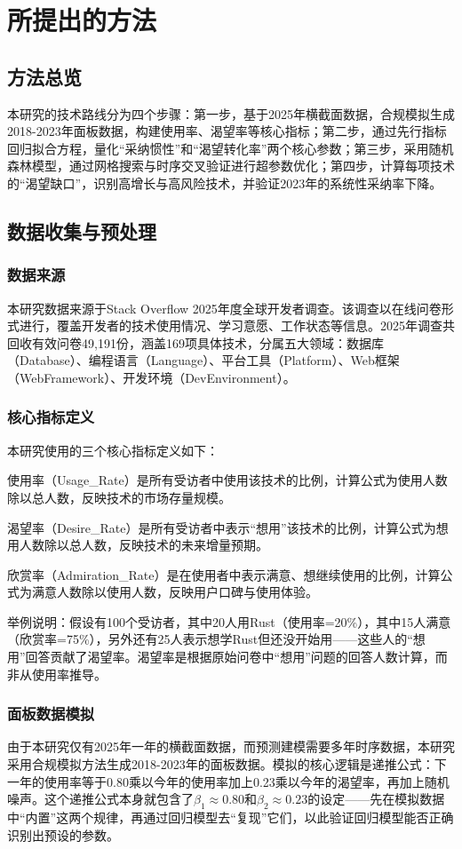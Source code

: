 \documentclass[fontset=windows]{cjc}
\begin{document}
\section{所提出的方法}
\subsection{方法总览}
本研究的技术路线分为四个步骤：第一步，基于2025年横截面数据，合规模拟生成2018-2023年面板数据，构建使用率、渴望率等核心指标；第二步，通过先行指标回归拟合方程，量化“采纳惯性”和“渴望转化率”两个核心参数；第三步，采用随机森林模型，通过网格搜索与时序交叉验证进行超参数优化；第四步，计算每项技术的“渴望缺口”，识别高增长与高风险技术，并验证2023年的系统性采纳率下降。

\subsection{数据收集与预处理}
\subsubsection{数据来源}
本研究数据来源于Stack Overflow 2025年度全球开发者调查。该调查以在线问卷形式进行，覆盖开发者的技术使用情况、学习意愿、工作状态等信息。2025年调查共回收有效问卷49,191份，涵盖169项具体技术，分属五大领域：数据库（Database）、编程语言（Language）、平台工具（Platform）、Web框架（WebFramework）、开发环境（DevEnvironment）。

\subsubsection{核心指标定义}
本研究使用的三个核心指标定义如下：

使用率（Usage\_Rate）是所有受访者中使用该技术的比例，计算公式为使用人数除以总人数，反映技术的市场存量规模。

渴望率（Desire\_Rate）是所有受访者中表示“想用”该技术的比例，计算公式为想用人数除以总人数，反映技术的未来增量预期。

欣赏率（Admiration\_Rate）是在使用者中表示满意、想继续使用的比例，计算公式为满意人数除以使用人数，反映用户口碑与使用体验。

举例说明：假设有100个受访者，其中20人用Rust（使用率=20\%），其中15人满意（欣赏率=75\%），另外还有25人表示想学Rust但还没开始用——这些人的“想用”回答贡献了渴望率。渴望率是根据原始问卷中“想用”问题的回答人数计算，而非从使用率推导。

\subsubsection{面板数据模拟}
由于本研究仅有2025年一年的横截面数据，而预测建模需要多年时序数据，本研究采用合规模拟方法生成2018-2023年的面板数据。模拟的核心逻辑是递推公式：下一年的使用率等于0.80乘以今年的使用率加上0.23乘以今年的渴望率，再加上随机噪声。这个递推公式本身就包含了$\beta_1\approx0.80$和$\beta_2\approx0.23$的设定——先在模拟数据中“内置”这两个规律，再通过回归模型去“复现”它们，以此验证回归模型能否正确识别出预设的参数。
\end{document}
